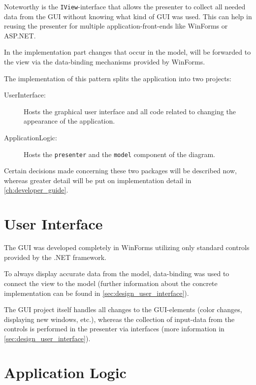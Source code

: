 Noteworthy is the \texttt{IView}-interface that allows the presenter to collect all needed data from the \ac{GUI} without knowing what kind of \ac{GUI} was used. This can help in reusing the presenter for multiple application-front-ends like WinForms or ASP.NET.

In the implementation part changes that occur in the model, will be forwarded to the view via the data-binding mechanisms provided by WinForms.

The implementation of this pattern splits the application into two projects:
\begin{description}
\item[UserInterface:] Hosts the graphical user interface and all code related to changing the appearance of the application.
\item[ApplicationLogic:] Hosts the \texttt{presenter} and the \texttt{model} component of the diagram.
\end{description}

Certain decisions made concerning these two packages will be described now, whereas greater detail will be put on implementation detail in \autoref{ch:developer_guide}.

\section{User Interface}
\label{sec:user_interface}

The \ac{GUI} was developed completely in WinForms utilizing only standard controls provided by the .NET framework.

To always display accurate data from the model, data-binding was used to connect the view to the model (further information about the concrete implementation can be found in \autoref{sec:design_user_interface}).

The \ac{GUI} project itself handles all changes to the \ac{GUI}-elements (color changes, displaying new windows, etc.), whereas the collection of input-data from the controls is performed in the presenter via interfaces (more information  in \autoref{sec:design_user_interface}).

\section{Application Logic}
\label{sec:application_logic}

